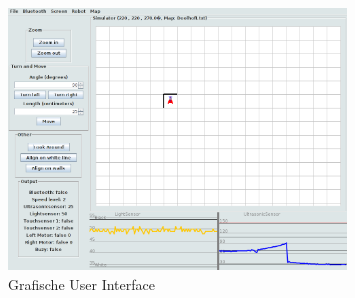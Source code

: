\documentclass[tt3]{penoverslag}
\begin{document}
\begin{figure}[tbp]
\begin{center}
    \includegraphics[width=0.8\textwidth]{GUI}
    \caption{Grafische User Interface}
	\label{fig:gui}
\end{center}
\end{figure}
\end{document}

